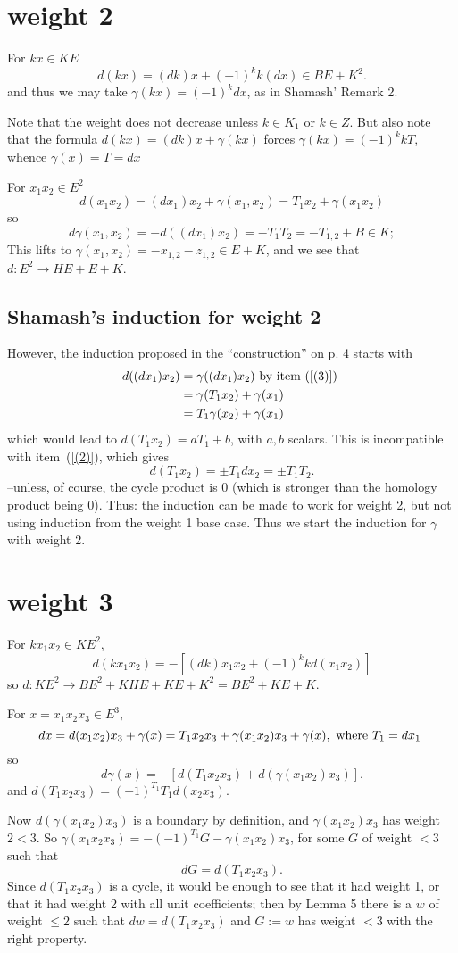 \documentclass[11pt]{amsart}
\def\g{{\gamma}}
\begin{document}
\section{weight 2} 
For $kx\in KE$ 
$$
d(kx) = (dk)x+(-1)^k k(dx) \in BE+K^2.
$$
and thus we may take $\g(kx) = (-1)^{k}dx$, as in Shamash' Remark 2.

Note that the weight does not decrease unless $k\in K_1$ or $k \in Z$. But also note that the formula
$d(kx) = (dk)x+ \g(kx)$ forces $\g(kx) = (-1)^{k}kT$, whence $\g(x) = T = dx$

For $x_1x_2\in E^2$
$$
d(x_1x_2)= (dx_1)x_2 +\g(x_1,x_2) = T_1x_2+\gamma(x_1x_2)
$$
so 
$$
d\gamma(x_1,x_2) = -d((dx_1)x_2) = -T_1T_2 =- T_{1,2}+B  \in K;
$$
This lifts to $\g(x_1,x_2)=-x_{1,2}-z_{1,2} \in E+K$, 
and we see that $d:E^2\to HE+ E+K$. 

\subsection{Shamash's induction for weight 2}
However, the induction proposed in the ``construction'' on p. 4 starts with 
\begin{align*}
d((dx_{1})x_{2})  &= \gamma((dx_{1})x_{2}) \hbox{ by item~(\ref{(3)}) }\\
&=\gamma(T_{1}x_{2})+\g(x_{1})\\
&=T_{1}\g(x_{2})+\g(x_{1})
\end{align*}
which would lead to $d(T_{1}x_{2}) = aT_{1}+b$, with $a,b$ scalars.
This is incompatible with item~(\ref{(2)}), which gives
$$
d(T_{1}x_{2}) = \pm T_{1}dx_{2} = \pm T_{1}T_{2}.
$$
--unless, of course,  the cycle product is 0 (which is stronger than the homology product being 0).
Thus: the induction can be made to work for weight 2, but not using induction from the weight 1 base case.
Thus we start the induction for $\g$ with weight 2.

\section{weight 3}
For $kx_1x_2\in KE^2$,
$$
d(kx_1x_2) = -[(dk)x_1x_2 + (-1)^k kd(x_1x_2)]
$$
so $d: KE^2 \to BE^2+KHE+KE+K^2 = BE^2+KE+K.$

For $x = x_1x_2x_3\in E^3$,
$$
dx = d(x_1x_2)x_3+\g(x) = T_1x_2x_3+\g(x_1x_2)x_3+\g(x), \hbox{ where $T_1 = dx_1$ }
$$
so
$$
d\g(x) = -[d(T_1x_2x_3)  + d(\g(x_1x_2)x_3)].
$$
and $d(T_1x_2x_3) = (-1)^{T_1}T_1d(x_2x_3)$.

Now $d(\g(x_1x_2)x_3)$ is a boundary by definition, and $\g(x_{1}x_{2})x_{3}$ has weight $2<3$. So
 $\g(x_1x_2x_3) = - (-1)^{T_{1}}G-\g(x_1x_2)x_3$, for some $G$  of weight $<3$ such that
$$
dG = d(T_1x_2x_3).
$$
Since $d(T_1x_2x_3)$ is a cycle, it would be enough to see that it had weight 1, or that it had weight 2 with
all unit coefficients; then by Lemma 5 there is a $w$ of weight 
$\leq 2$ such that $dw = d(T_1x_2x_3)$ and  $G := w$ has weight $<3$ with
the right property.
\end{document}
